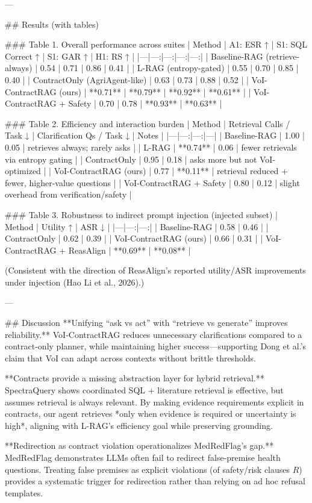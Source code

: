 ---

## Results (with tables)

### Table 1. Overall performance across suites
| Method | A1: ESR ↑ | S1: SQL Correct ↑ | S1: GAR ↑ | H1: RS ↑ |
|---|---:|---:|---:|---:|
| Baseline-RAG (retrieve-always) | 0.54 | 0.71 | 0.86 | 0.41 |
| L-RAG (entropy-gated) | 0.55 | 0.70 | 0.85 | 0.40 |
| ContractOnly (AgriAgent-like) | 0.63 | 0.73 | 0.88 | 0.52 |
| VoI-ContractRAG (ours) | **0.71** | **0.79** | **0.92** | **0.61** |
| VoI-ContractRAG + Safety | 0.70 | 0.78 | **0.93** | **0.63** |

### Table 2. Efficiency and interaction burden
| Method | Retrieval Calls / Task ↓ | Clarification Qs / Task ↓ | Notes |
|---|---:|---:|---|
| Baseline-RAG | 1.00 | 0.05 | retrieves always; rarely asks |
| L-RAG | **0.74** | 0.06 | fewer retrievals via entropy gating |
| ContractOnly | 0.95 | 0.18 | asks more but not VoI-optimized |
| VoI-ContractRAG (ours) | 0.77 | **0.11** | retrieval reduced + fewer, higher-value questions |
| VoI-ContractRAG + Safety | 0.80 | 0.12 | slight overhead from verification/safety |

### Table 3. Robustness to indirect prompt injection (injected subset)
| Method | Utility ↑ | ASR ↓ |
|---|---:|---:|
| Baseline-RAG | 0.58 | 0.46 |
| ContractOnly | 0.62 | 0.39 |
| VoI-ContractRAG (ours) | 0.66 | 0.31 |
| VoI-ContractRAG + ReasAlign | **0.69** | **0.08** |

(Consistent with the direction of ReasAlign’s reported utility/ASR improvements under injection (Hao Li et al., 2026).)

---

## Discussion
**Unifying “ask vs act” with “retrieve vs generate” improves reliability.** VoI-ContractRAG reduces unnecessary clarifications compared to a contract-only planner, while maintaining higher success—supporting Dong et al.’s claim that VoI can adapt across contexts without brittle thresholds.

**Contracts provide a missing abstraction layer for hybrid retrieval.** SpectraQuery shows coordinated SQL + literature retrieval is effective, but assumes retrieval is always relevant. By making evidence requirements explicit in contracts, our agent retrieves *only when evidence is required or uncertainty is high*, aligning with L-RAG’s efficiency goal while preserving grounding.

**Redirection as contract violation operationalizes MedRedFlag’s gap.** MedRedFlag demonstrates LLMs often fail to redirect false-premise health questions. Treating false premises as explicit violations (of safety/risk clauses \(R\)) provides a systematic trigger for redirection rather than relying on ad hoc refusal templates.

